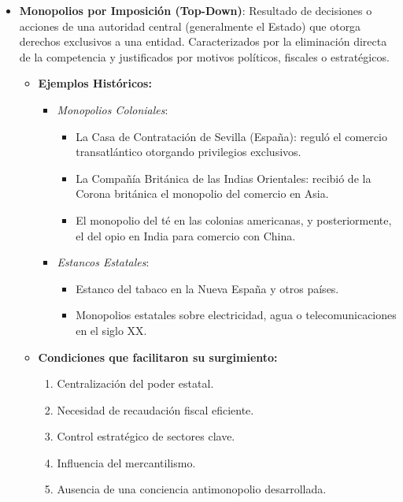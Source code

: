 \documentclass[a4paper,12pt]{article}
\begin{document}
\begin{itemize}
    \item \textbf{Monopolios por Imposición (Top-Down)}: 
    Resultado de decisiones o acciones de una autoridad central (generalmente el Estado) que otorga derechos exclusivos a una entidad. Caracterizados por la eliminación directa de la competencia y justificados por motivos políticos, fiscales o estratégicos.

    \begin{itemize}
        \item \textbf{Ejemplos Históricos:}
        \begin{itemize}
            \item \textit{Monopolios Coloniales}:
            \begin{itemize}
                \item La Casa de Contratación de Sevilla (España): reguló el comercio transatlántico otorgando privilegios exclusivos.
                \item La Compañía Británica de las Indias Orientales: recibió de la Corona británica el monopolio del comercio en Asia.
                \item El monopolio del té en las colonias americanas, y posteriormente, el del opio en India para comercio con China.
            \end{itemize}
            \item \textit{Estancos Estatales}:
            \begin{itemize}
                \item Estanco del tabaco en la Nueva España y otros países.
                \item Monopolios estatales sobre electricidad, agua o telecomunicaciones en el siglo XX.
            \end{itemize}
        \end{itemize}

        \item \textbf{Condiciones que facilitaron su surgimiento:}
        \begin{enumerate}
            \item Centralización del poder estatal.
            \item Necesidad de recaudación fiscal eficiente.
            \item Control estratégico de sectores clave.
            \item Influencia del mercantilismo.
            \item Ausencia de una conciencia antimonopolio desarrollada.
        \end{enumerate}
    \end{itemize}


\end{itemize}
\end{document}

